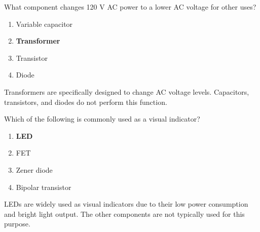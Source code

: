 \begin{tcolorbox}[colback=gray!10!white,colframe=black!75!black,title={T6D06}]
What component changes 120 V AC power to a lower AC voltage for other uses?
\begin{enumerate}[label=\Alph*),noitemsep]
    \item Variable capacitor
    \item \textbf{Transformer}
    \item Transistor
    \item Diode
\end{enumerate}
\end{tcolorbox}
Transformers are specifically designed to change AC voltage levels. Capacitors, transistors, and diodes do not perform this function.

\begin{tcolorbox}[colback=gray!10!white,colframe=black!75!black,title={T6D07}]
Which of the following is commonly used as a visual indicator?
\begin{enumerate}[label=\Alph*),noitemsep]
    \item \textbf{LED}
    \item FET
    \item Zener diode
    \item Bipolar transistor
\end{enumerate}
\end{tcolorbox}
LEDs are widely used as visual indicators due to their low power consumption and bright light output. The other components are not typically used for this purpose.
